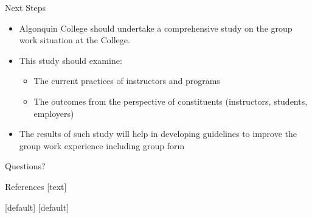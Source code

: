 \documentclass[12pt,table,aspectratio=169]{beamer}
\begin{document}
\begin{frame}{Next Steps}
\begin{itemize}
    \item Algonquin College should undertake a comprehensive study on the group work situation at the College.
    \item This study should examine:
    \begin{itemize}
        \item The current practices of instructors and programs
        \item The outcomes from the perspective of constituents (instructors, students, employers)
    \end{itemize}
        \item The results of such study will help in developing guidelines to improve the group work experience including group form
\end{itemize}
\end{frame}

\begin{frame}[standout]
  \Huge Questions?
\end{frame}


\begin{frame}[allowframebreaks]{References}
    [text] 
    
    [default]
    [default]
    
\end{frame}
\end{document}
